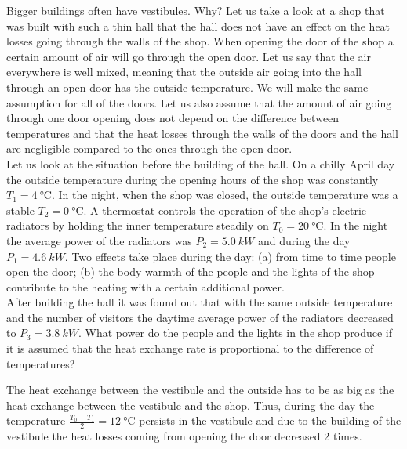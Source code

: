 {\ifEngStatement
Bigger buildings often have vestibules. Why? Let us take a look at a shop that was built with such a thin hall that the hall does not have an effect on the heat losses going through the walls of the shop. When opening the door of the shop a certain amount of air will go through the open door. Let us say that the air everywhere is well mixed, meaning that the outside air going into the hall through an open door has the outside temperature. We will make the same assumption for all of the doors. Let us also assume that the amount of air going through one door opening does not depend on the difference between temperatures and that the heat losses through the walls of the doors and the hall are negligible compared to the ones through the open door.\\
Let us look at the situation before the building of the hall. On a chilly April day the outside temperature during the opening hours of the shop was constantly $T_1=\SI{4}{\celsius}$. In the night, when the shop was closed, the outside temperature was a stable $T_2=\SI{0}{\celsius}$. A thermostat controls the operation of the shop’s electric radiators by holding the inner temperature steadily on $T_0=\SI{20}{\celsius}$. In the night the average power of the radiators was $P_2= \SI{5,0}{kW}$ and during the day $P_1=\SI{4,6}{kW}$. Two effects take place during the day: (a) from time to time people open the door; (b) the body warmth of the people and the lights of the shop contribute to the heating with a certain additional power.\\
After building the hall it was found out that with the same outside temperature and the number of visitors the daytime average power of the radiators decreased to $P_3=\SI{3,8}{kW}$. What power do the people and the lights in the shop produce if it is assumed that the heat exchange rate is proportional to the difference of temperatures?
\fi


\ifEngHint
The heat exchange between the vestibule and the outside has to be as big as the heat exchange between the vestibule and the shop. Thus, during the day the temperature $\frac{T_0+T_1}{2}=\SI{12}{\celsius}$ persists in the vestibule and due to the building of the vestibule the heat losses coming from opening the door decreased 2 times.
\fi


}

